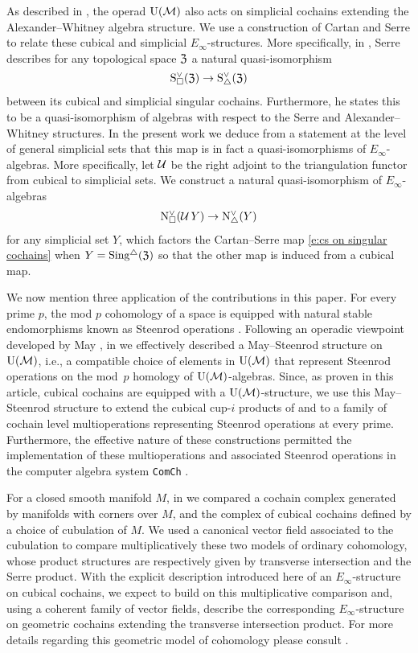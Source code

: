 As described in \cite{medina2020prop1}, the operad ${\operatorname{U}(\mathcal{M})}$ also acts on simplicial cochains extending the Alexander--Whitney algebra structure.
We use a construction of Cartan and Serre to relate these cubical and simplicial $E_\infty$-structures.
More specifically, in \cite[p. 442]{serre1951homologie}, Serre describes for any topological space $\mathfrak{Z}$ a natural quasi-isomorphism
\begin{equation} \label{e:cs on singular cochains}
	\operatorname{S^{\vee}_{\square}}(\mathfrak{Z}) \to \operatorname{S^{\vee}_{\triangle}}(\mathfrak{Z})
\end{equation}
between its cubical and simplicial singular cochains.
Furthermore, he states this to be a quasi-isomorphism of algebras with respect to the Serre and Alexander--Whitney structures.
In the present work we deduce from a statement at the level of general simplicial sets that this map is in fact a quasi-isomorphisms of $E_\infty$-algebras.
More specifically, let $\operatorname{\mathcal{U}}$ be the right adjoint to the triangulation functor from cubical to simplicial sets.
We construct a natural quasi-isomorphism of $E_\infty$-algebras
\[
\operatorname{N^{\vee}_{\square}}(\operatorname{\mathcal{U}} Y) \to \operatorname{N^{\vee}_{\triangle}}(Y)
\]
for any simplicial set $Y$, which factors the Cartan--Serre map \eqref{e:cs on singular cochains} when $Y = \operatorname{Sing^{\triangle}}(\mathfrak{Z})$ so that the other map is induced from a cubical map.

We now mention three application of the contributions in this paper.
For every prime $p$, the mod $p$ cohomology of a space is equipped with natural stable endomorphisms known as Steenrod operations \cite{steenrod1962cohomology}.
Following an operadic viewpoint developed by May \cite{may1970general}, in \cite{medina2021may_st} we effectively described a May--Steenrod structure on ${\operatorname{U}(\mathcal{M})}$, i.e., a compatible choice of elements in ${\operatorname{U}(\mathcal{M})}$ that represent Steenrod operations on the mod~$p$ homology of ${\operatorname{U}(\mathcal{M})}$-algebras.
Since, as proven in this article, cubical cochains are equipped with a ${\operatorname{U}(\mathcal{M})}$-structure, we use this May--Steenrod structure to extend the cubical cup-$i$ products of \cite{kadeishvili1999coproducts} and \cite{pilarczyk2016cubical} to a family of cochain level multioperations representing Steenrod operations at every prime.
Furthermore, the effective nature of these constructions permitted the implementation of these multioperations and associated Steenrod operations in the computer algebra system \texttt{ComCh} \cite{medina2021comch}.

For a closed smooth manifold $M$, in \cite{medina2021flowing} we compared a cochain complex generated by manifolds with corners over $M$, and the complex of cubical cochains defined by a choice of cubulation of $M$.
We used a canonical vector field associated to the cubulation to compare multiplicatively these two models of ordinary cohomology, whose product structures are respectively given by transverse intersection and the Serre product.
With the explicit description introduced here of an $E_\infty$-structure on cubical cochains, we expect to build on this multiplicative comparison and, using a coherent family of vector fields, describe the corresponding $E_\infty$-structure on geometric cochains extending the transverse intersection product.
For more details regarding this geometric model of cohomology please consult \cite{medina2022foundations}.

